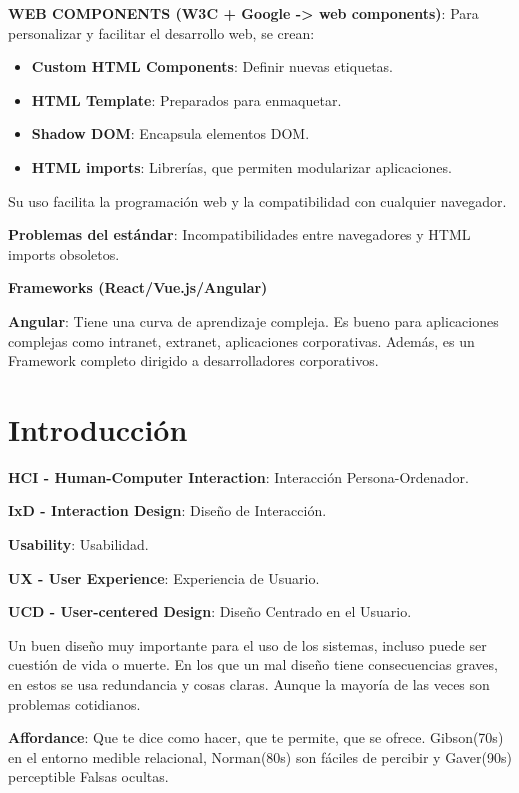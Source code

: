 \documentclass[12pt, twoside, openright]{report} %
\begin{document}
\textbf{WEB COMPONENTS (W3C + Google -\textgreater{} web components)}: Para personalizar y facilitar el desarrollo web, se crean:

\begin{itemize}
	\item \textbf{Custom HTML Components}: Definir nuevas etiquetas.
	\item \textbf{HTML Template}: Preparados para enmaquetar.
	\item \textbf{Shadow DOM}: Encapsula elementos DOM.
	\item \textbf{HTML imports}: Librerías, que permiten modularizar
	      aplicaciones.
\end{itemize}

Su uso facilita la programación web y la compatibilidad con cualquier
navegador.

\textbf{Problemas del estándar}: Incompatibilidades entre navegadores y
HTML imports obsoletos.

\textbf{Frameworks (React/Vue.js/Angular)}

\textbf{Angular}: Tiene una curva de aprendizaje compleja. Es bueno para aplicaciones complejas como intranet, extranet, aplicaciones corporativas. Además, es un Framework completo dirigido a desarrolladores corporativos.

\chapter{Introducción}

\textbf{HCI - Human-Computer Interaction}: Interacción
Persona-Ordenador.

\textbf{IxD - Interaction Design}: Diseño de Interacción.

\textbf{Usability}: Usabilidad.

\textbf{UX - User Experience}: Experiencia de Usuario.

\textbf{UCD - User-centered Design}: Diseño Centrado en el Usuario.

Un buen diseño muy importante para el uso de los sistemas, incluso puede ser cuestión de vida o muerte. En los que un mal diseño tiene consecuencias graves, en estos se usa redundancia y cosas claras. Aunque la mayoría de las veces son problemas cotidianos.

\textbf{Affordance}: Que te dice como hacer, que te permite, que se
ofrece. Gibson(70s) en el entorno medible relacional, Norman(80s) son
fáciles de percibir y Gaver(90s) perceptible Falsas ocultas.
\end{document}
